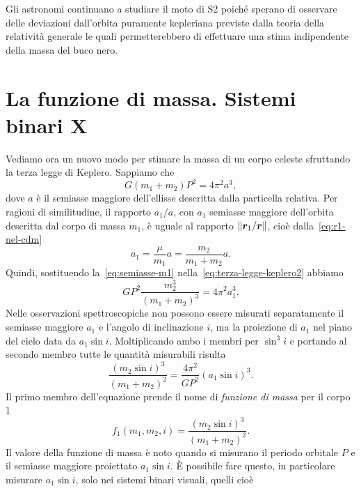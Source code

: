 Gli astronomi continuano a studiare il moto di S2 poiché sperano di osservare
delle deviazioni dall'orbita puramente kepleriana previste dalla teoria della
relatività generale le quali permetterebbero di effettuare una stima
indipendente della massa del buco nero.

\section{La funzione di massa. Sistemi binari X}
\label{sec:funzione-massa}

Vediamo ora un nuovo modo per stimare la massa di un corpo celeste sfruttando la
terza legge di Keplero. Sappiamo che
\begin{equation}
  \label{eq:terza-legge-keplero2}
  G(m_1 + m_2)  P^2 = 4\pi^2a^3,
\end{equation}
dove $a$ è il semiasse maggiore dell'ellisse descritta dalla particella
relativa. Per ragioni di similitudine, il rapporto $a_1/a$, con $a_1$ semiasse
maggiore dell'orbita descritta dal corpo di massa $m_1$, è uguale al rapporto
$\lVert\bm{r}_1/\bm{r}\rVert$, cioè dalla~\eqref{eq:r1-nel-cdm}
\begin{equation}
  \label{eq:semiasse-m1}
  a_1 = \frac{\mu}{m_1}a = \frac{m_2}{m_1 + m_2}a.
\end{equation}
Quindi, sostituendo la~\eqref{eq:semiasse-m1}
nella~\eqref{eq:terza-legge-keplero2} abbiamo
\begin{equation}
  GP^2\frac{m_2^3}{(m_1 + m_2)^3} = 4\pi^2a_1^3.
\end{equation}
Nelle osservazioni spettroscopiche non possono essere misurati separatamente il
semiasse maggiore $a_1$ e l'angolo di inclinazione $i$, ma la proiezione di
$a_1$ nel piano del cielo data da $a_1\sin i$. Moltiplicando ambo i membri per
$\sin^3 i$ e portando al secondo membro tutte le quantità misurabili risulta
\begin{equation}
  \label{eq:valore-funzione-massa}
  \frac{(m_2\sin i)^3}{(m_1 + m_2)^2} = \frac{4\pi^2}{GP^2}(a_1\sin i)^3.
\end{equation}
Il primo membro dell'equazione prende il nome di \emph{funzione di massa} per il
corpo $1$
\begin{equation}
  f_1(m_1,m_2,i) = \frac{(m_2\sin i)^3}{(m_1 + m_2)^2}.
\end{equation}
Il valore della funzione di massa è noto quando si misurano il periodo orbitale
$P$ e il semiasse maggiore proiettato $a_1\sin i$. È possibile fare questo, in
particolare misurare $a_1\sin i$, solo nei sistemi binari visuali, quelli cioè
